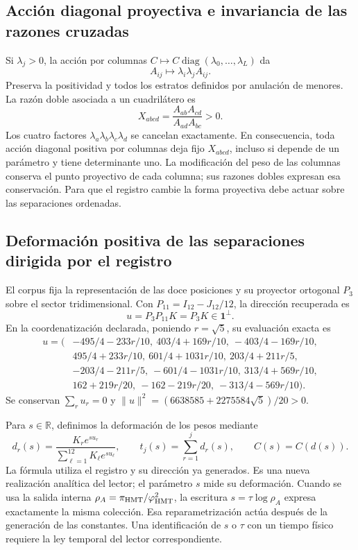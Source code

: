 \subsection{Acción diagonal proyectiva e invariancia de las razones cruzadas}

Si \(\lambda_j>0\), la acción por columnas
\(C\mapsto C\operatorname{diag}(\lambda_0,\ldots,\lambda_L)\) da
\[
 A_{ij}\longmapsto\lambda_i\lambda_j A_{ij}.
\]
Preserva la positividad y todos los estratos definidos por anulación de
menores. La razón doble asociada a un cuadrilátero es
\begin{equation}
 X_{abcd}=\frac{A_{ab}A_{cd}}{A_{ad}A_{bc}}>0.
 \label{eq:nc-crossratio}
\end{equation}
Los cuatro factores \(\lambda_a\lambda_b\lambda_c\lambda_d\) se
cancelan exactamente. En consecuencia, toda acción diagonal positiva por
columnas deja fijo \(X_{abcd}\), incluso si depende de un parámetro y
tiene determinante uno. La modificación del peso de las columnas conserva
el punto proyectivo de cada columna; sus razones dobles expresan esa
conservación. Para que el registro cambie la forma proyectiva debe actuar
sobre las separaciones ordenadas.

\subsection{Deformación positiva de las separaciones dirigida por el registro}

El corpus fija la representación de las doce posiciones y su proyector
ortogonal \(P_3\) sobre el sector tridimensional. Con
\(P_{11}=I_{12}-J_{12}/12\), la dirección recuperada es
\[
 u=P_3P_{11}K=P_3K\in\mathbf1^\perp.
\]
En la coordenatización declarada, poniendo \(r=\sqrt5\), su evaluación exacta es
\begin{align*}
u=(&-495/4-233r/10,\ 403/4+169r/10,\ -403/4-169r/10,\\
   &495/4+233r/10,\ 601/4+1031r/10,\ 203/4+211r/5,\\
   &-203/4-211r/5,\ -601/4-1031r/10,\ 313/4+569r/10,\\
   &162+219r/20,\ -162-219r/20,\ -313/4-569r/10).
\end{align*}
Se conservan \(\sum_ru_r=0\) y
\(\|u\|^2=(6638585+2275584\sqrt5)/20>0\).

Para \(s\in\mathbb R\), definimos la deformación de los pesos mediante
\begin{equation}
 d_r(s)=\frac{K_re^{su_r}}{\sum_{\ell=1}^{12}K_\ell e^{su_\ell}},
 \qquad t_j(s)=\sum_{r=1}^jd_r(s),\qquad C(s)=C(d(s)).
 \label{eq:nc-gap-flow}
\end{equation}
La fórmula utiliza el registro y su dirección ya generados. Es una nueva
realización analítica del lector; el parámetro \(s\) mide su deformación.
Cuando se usa la salida interna \(\rho_A=\pi_{\rm HMT}/\varphi_{\rm HMT}^2\),
la escritura \(s=\tau\log\rho_A\) expresa exactamente la misma colección.
Esa reparametrización actúa después de la generación de las constantes.
Una identificación de \(s\) o \(\tau\) con un tiempo físico requiere la
ley temporal del lector correspondiente.


